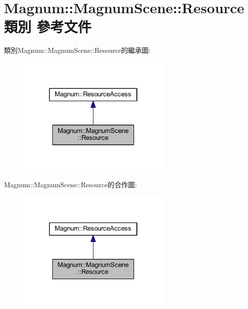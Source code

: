 \hypertarget{class_magnum_1_1_magnum_scene_1_1_resource}{}\section{Magnum\+:\+:Magnum\+Scene\+:\+:Resource 類別 參考文件}
\label{class_magnum_1_1_magnum_scene_1_1_resource}


類別\+Magnum\+:\+:Magnum\+Scene\+:\+:Resource的繼承圖\+:\nopagebreak
\begin{figure}[H]
\begin{center}
\leavevmode
\includegraphics[width=214pt]{class_magnum_1_1_magnum_scene_1_1_resource__inherit__graph}
\end{center}
\end{figure}


Magnum\+:\+:Magnum\+Scene\+:\+:Resource的合作圖\+:\nopagebreak
\begin{figure}[H]
\begin{center}
\leavevmode
\includegraphics[width=214pt]{class_magnum_1_1_magnum_scene_1_1_resource__coll__graph}
\end{center}
\end{figure}
